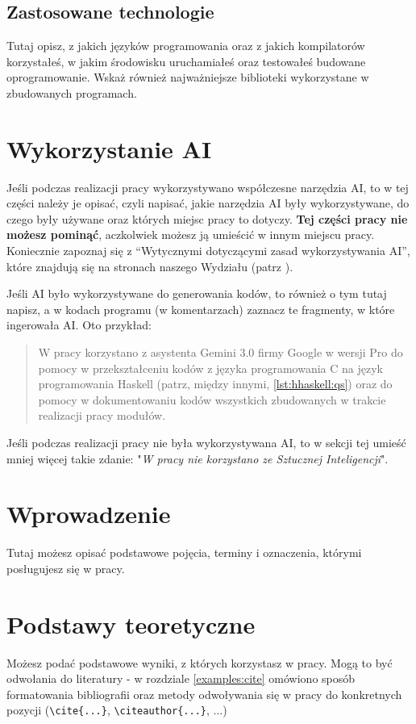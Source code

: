 \subsection*{Zastosowane technologie}

Tutaj opisz, z jakich języków programowania oraz z jakich kompilatorów korzystałeś, 
w jakim środowisku uruchamiałeś oraz testowałeś budowane oprogramowanie. Wskaż również najważniejsze biblioteki wykorzystane w zbudowanych programach.

\section{Wykorzystanie AI}

Jeśli podczas realizacji pracy wykorzystywano współczesne narzędzia AI, 
to w tej części należy je opisać, czyli napisać, jakie narzędzia AI były wykorzystywane, do czego były używane oraz których miejsc pracy to dotyczy. \textbf{Tej części pracy nie możesz pominąć}, aczkolwiek możesz ją umieścić w innym miejscu pracy. 
Koniecznie zapoznaj się z ``Wytycznymi dotyczącymi zasad wykorzystywania AI'', które znajdują się na stronach naszego Wydziału (patrz \cite{WITWytyczneSI}).\par

Jeśli AI było wykorzystywane do generowania kodów, to również o tym tutaj napisz, a w kodach programu (w komentarzach) zaznacz  te fragmenty, w które ingerowała AI. Oto przykład:

\begin{quote}
  W pracy korzystano z asystenta Gemini 3.0 firmy Google w wersji Pro do pomocy w przekształceniu kodów z języka programowania C na język programowania Haskell (patrz, między innymi, \cref{lst:hhaskell:qs}) oraz do pomocy w dokumentowaniu kodów wszystkich zbudowanych w trakcie realizacji pracy modułów. 
\end{quote}

Jeśli podczas realizacji pracy nie była  wykorzystywana AI, to w sekcji tej umieść mniej więcej takie zdanie: 
"\textit{W pracy nie korzystano ze Sztucznej Inteligencji}".    


\section{Wprowadzenie} 
\label{chapt1:sec:intro}

Tutaj możesz opisać podstawowe pojęcia, terminy i oznaczenia, którymi posługujesz się w pracy. 

\section{Podstawy teoretyczne}

Możesz podać podstawowe wyniki, z których korzystasz w pracy. 
Mogą to być odwołania do literatury - w rozdziale \ref{examples:cite} omówiono sposób formatowania bibliografii oraz metody odwoływania się w pracy do konkretnych pozycji (\verb|\cite{...}|, \verb|\citeauthor{...}|, ...)    

